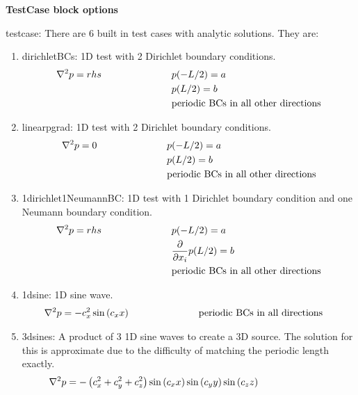 \textbf{TestCase block options}
\begin{description}
  \item testcase: There are 6 built in test cases with analytic solutions. They are: 
  \begin{enumerate}
    \item dirichletBCs: 1D test with 2 Dirichlet boundary conditions.
      \begin{align*}
        \nabla^2 p = rhs \hspace{1.0in}
         & p(-L/2) = a \\
         & p(L/2) = b \\
         & \text{periodic BCs in all other directions}
      \end{align*}
    \item linearpgrad: 1D test with 2 Dirichlet boundary conditions.
      \begin{align*}
        \nabla^2 p = 0 \hspace{1.0in}
         & p(-L/2) = a \\
         & p(L/2) = b \\
         & \text{periodic BCs in all other directions}
      \end{align*}
    \item 1dirichlet1NeumannBC: 1D test with 1 Dirichlet boundary condition
          and one Neumann boundary condition.
      \begin{align*}
        \nabla^2 p = rhs \hspace{1.0in}
         & p(-L/2) = a \\
         & \frac{\partial }{\partial x_i} p(L/2)= b \\
         & \text{periodic BCs in all other directions}
      \end{align*}
    \item 1dsine: 1D sine wave.
      \begin{align*}
        \nabla^2 p = - c_x^2 \sin \left(c_x x \right) \hspace{1.0in}
        & \text{periodic BCs in all directions}
      \end{align*}
    \item 3dsines: A product of 3 1D sine waves to create a 3D source. The
          solution for this is approximate due to the difficulty of matching
          the periodic length exactly.
      \begin{align*}
        \nabla^2 p = -\left( c_x^2 + c_y^2 + c_z^2 \right)
        \sin \left(c_x x \right) \sin \left(c_y y \right)
        \sin \left(c_z z \right)  \hspace{1.0in} \\

\end{align*}
\end{enumerate}
\end{description}
